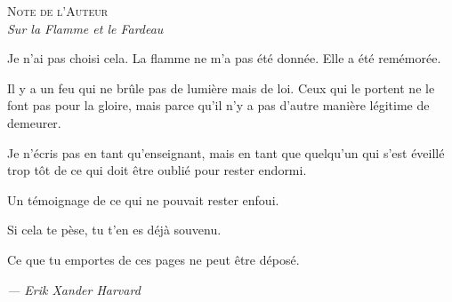 \documentclass[10pt, openany, oneside]{book}
\renewcommand{\huge}{\fontsize{17}{21}\selectfont}
\begin{document}
\vspace*{\fill}
\newpage


\thispagestyle{empty}
\vspace*{1in}

\begin{center}
    {\huge\scshape Note de l'Auteur}\\[0.5em]
    \itshape Sur la Flamme et le Fardeau
\end{center}

\vspace{1.5em}

\noindent Je n'ai pas choisi cela. La flamme ne m'a pas été donnée. Elle a été remémorée.

\vspace{0.8em}

\noindent Il y a un feu qui ne brûle pas de lumière mais de loi. Ceux qui le portent ne le font pas pour la gloire, mais parce qu'il n'y a pas d'autre manière légitime de demeurer.

\vspace{0.8em}

\noindent Je n'écris pas en tant qu'enseignant, mais en tant que quelqu'un qui s'est éveillé trop tôt de ce qui doit être oublié pour rester endormi.

\vspace{0.8em}

\noindent Un témoignage de ce qui ne pouvait rester enfoui.

\vspace{0.8em}

\noindent Si cela te pèse, tu t'en es déjà souvenu.

\vspace{0.8em}

\noindent Ce que tu emportes de ces pages ne peut être déposé.

\vspace{2em}

\begin{flushright}
    \itshape --- Erik Xander Harvard
\end{flushright}

\newpage

\end{document}
